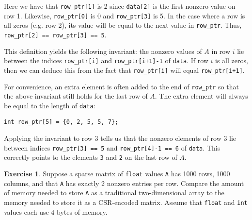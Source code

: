 \documentclass{article}
\theoremstyle{definition}
\newtheorem{exercise}{Exercise}
\begin{document}
Here we have that \texttt{row\_ptr[1]} is 2 since \texttt{data[2]} is the first nonzero value on row 1. Likewise, \texttt{row\_ptr[0]} is 0 and \texttt{row\_ptr[3]} is 5. In the case where a row is all zeros (e.g. row 2), its value will be equal to the next value in \texttt{row\_ptr}. Thus, \texttt{row\_ptr[2] == row\_ptr[3] == 5}.

This definition yields the following invariant: the nonzero values of $A$ in row $i$ lie between the indices \texttt{row\_ptr[i]} and \texttt{row\_ptr[i+1]-1} of \texttt{data}. If row $i$ is all zeros, then we can deduce this from the fact that \texttt{row\_ptr[i]} will equal \texttt{row\_ptr[i+1]}.

For convenience, an extra element is often added to the end of \texttt{row\_ptr} so that the above invariant still holds for the last row of $A$. The extra element will always be equal to the length of \texttt{data}:

\begin{verbatim}
int row_ptr[5] = {0, 2, 5, 5, 7};
\end{verbatim}

Applying the invariant to row 3 tells us that the nonzero elements of row 3 lie between indices \texttt{row\_ptr[3] == 5} and \texttt{row\_ptr[4]-1 == 6} of \texttt{data}. This correctly points to the elements \texttt{3} and \texttt{2} on the last row of $A$.

\begin{exercise}
Suppose a sparse matrix of \texttt{float} values \texttt{A} has 1000 rows, 1000 columns, and that \texttt{A} has exactly $2$ nonzero entries per row. Compare the amount of memory needed to store \texttt{A} as a traditional two-dimensional array to the memory needed to store it as a CSR-encoded matrix. Assume that \texttt{float} and \texttt{int} values each use $4$ bytes of memory.
\end{exercise}
\end{document}
